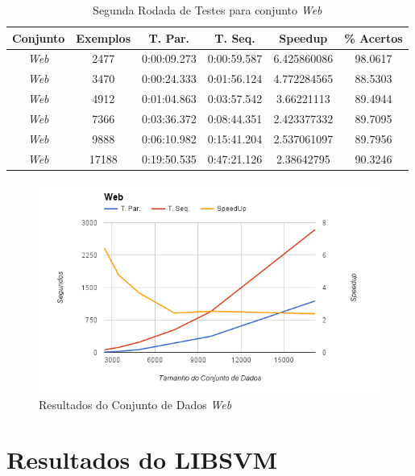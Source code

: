 
\begin{table}
    \caption{Segunda Rodada de Testes para conjunto \emph{Web}}
    \label{tab:bestResults2w}
    \small
    \centering
    \begin{tabular}{|c|c|c|c|c|c|} \hline
		Conjunto & Exemplos & T. Par. & T. Seq. & Speedup & \% Acertos\\ \hline
		\em{Web} & 2477 & 0:00:09.273 & 0:00:59.587 & 6.425860086 & 98.0617\\ \hline
		\em{Web} & 3470 & 0:00:24.333 & 0:01:56.124 & 4.772284565 & 88.5303\\ \hline
		\em{Web} & 4912 & 0:01:04.863 & 0:03:57.542 & 3.66221113 & 89.4944\\ \hline
		\em{Web} & 7366 & 0:03:36.372 & 0:08:44.351 & 2.423377332 & 89.7095\\ \hline
		\em{Web} & 9888 & 0:06:10.982 & 0:15:41.204 & 2.537061097 & 89.7956\\ \hline
		\em{Web} & 17188 & 0:19:50.535 & 0:47:21.126 & 2.38642795 & 90.3246\\ \hline
    \end{tabular}
\end{table}

\begin{figure}
  \centering
  \includegraphics[width=1\textwidth]{imagens/GraficoWeb.png}
  \caption{Resultados do Conjunto de Dados \emph{Web}}
  \label{fig:GraficoWeb}
\end{figure}


\section{Resultados do LIBSVM}


